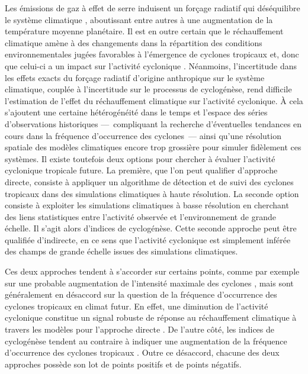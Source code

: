 \documentclass[../main.tex]{subfiles}
\begin{document}
Les émissions de gaz à effet de serre induisent un forçage radiatif qui déséquilibre le système climatique \parencite{charney_carbon_1979}, aboutissant
entre autres à une augmentation de la température moyenne planétaire. Il est en outre
certain que le réchauffement climatique amène à des changements dans la répartition des conditions environnementales jugées favorables à l'émergence de cyclones
tropicaux et, donc que celui-ci a un impact sur l'activité cyclonique \parencite{seneviratne_weather_2021}. Néanmoins, l'incertitude dans les effets exacts du forçage radiatif d'origine anthropique
sur le système climatique, couplée à l'incertitude sur le processus de cyclogénèse, rend difficile l'estimation de l'effet du réchauffement climatique sur
l'activité cyclonique. À cela s'ajoutent une certaine hétérogénéité dans le temps et l'espace des séries d'observations historiques ---~compliquant la recherche
d'éventuelles tendances en cours dans la fréquence d'occurrence des cyclones~--- ainsi qu'une résolution spatiale des modèles climatiques encore trop grossière
pour simuler fidèlement ces systèmes. Il existe toutefois deux options pour chercher à évaluer l'activité cyclonique tropicale future. La première, que l'on
peut qualifier d'approche directe, consiste à appliquer un algorithme de détection et de suivi des cyclones tropicaux dans des simulations climatiques à haute
résolution. La seconde option consiste à exploiter les simulations climatiques à basse résolution en cherchant des liens statistiques entre
l'activité observée et l'environnement de grande échelle. Il s'agit alors d'indices de cyclogénèse. Cette seconde approche peut être qualifiée d'indirecte, en
ce sens que l'activité cyclonique est simplement inférée des champs de grande échelle issues des simulations climatiques.

Ces deux approches tendent à s'accorder sur certains points, comme par exemple sur une probable augmentation de l'intensité maximale des cyclones
\parencite{sobel_human_2016,bhatia_projected_2018}, mais sont généralement en désaccord sur la question de la fréquence d'occurrence des cyclones tropicaux en
climat futur. En effet, une diminution de l'activité cyclonique constitue un signal robuste de réponse au réchauffement climatique à travers les modèles pour
l'approche directe \parencite{christensen_climate_2013,knutson_tropical_2020}. De l'autre côté, les indices de cyclogénèse tendent au contraire à indiquer une
augmentation de la fréquence d'occurrence des cyclones tropicaux \parencite{emanuel_downscaling_2013,camargo_testing_2014}. Outre ce désaccord, chacune des deux
approches possède son lot de points positifs et de points négatifs.
\end{document}
